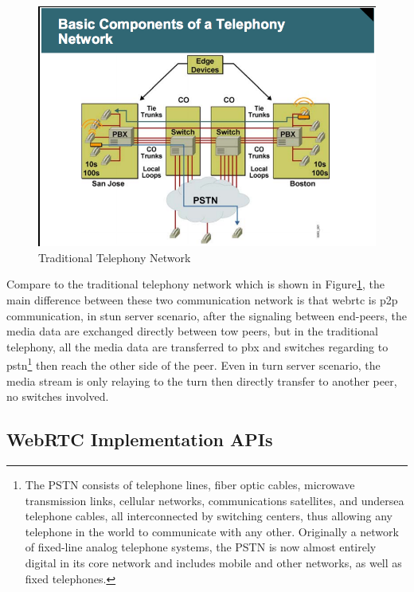 \begin{figure}
	\centering
    	\includegraphics[height=0.40\textheight,natwidth=610,natheight=642]{figs/telephony_network.png}
  	\caption{Traditional Telephony Network}
  	\label{fig:telephony_network}
\end{figure}

\par Compare to the traditional telephony network which is shown in Figure\ref{fig:telephony_network}\cite{web:teleVSvoip}, the main difference between these two communication network is that \gls{webrtc} is \gls{p2p} communication, in \gls{stun} server scenario, after the signaling between end-peers, the media data are exchanged directly between tow peers, but in the traditional telephony, all the media data are transferred to \gls{pbx} and switches regarding to \gls{pstn}\footnote{The PSTN consists of telephone lines, fiber optic cables, microwave transmission links, cellular networks, communications satellites, and undersea telephone cables, all interconnected by switching centers, thus allowing any telephone in the world to communicate with any other. Originally a network of fixed-line analog telephone systems, the PSTN is now almost entirely digital in its core network and includes mobile and other networks, as well as fixed telephones.\cite{wiki:pstn}} then reach the other side of the peer. Even in \gls{turn} server scenario, the media stream is only relaying to the \gls{turn} then directly transfer to another peer, no switches involved.

\subsection{WebRTC Implementation APIs}

